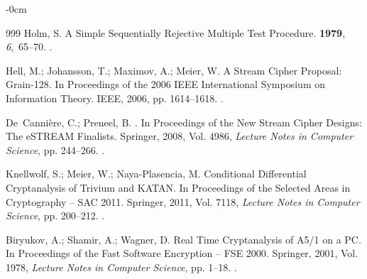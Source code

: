 \documentclass[electronics,article,submit,pdftex,oneauthor]{Definitions/mdpi}
\begin{document}
\begin{adjustwidth}{-\extralength}{0cm}
\begin{thebibliography}{999}
Holm, S.
\newblock A Simple Sequentially Rejective Multiple Test Procedure.
 {\bf 1979}, {\em 6},~65--70.
.

Hell, M.; Johansson, T.; Maximov, A.; Meier, W.
\newblock A Stream Cipher Proposal: {Grain}-128.
\newblock In Proceedings of the 2006 {IEEE} International Symposium on
  Information Theory. IEEE,  2006, pp. 1614--1618.
.

De~Canni{\`e}re, C.; Preneel, B.
.
\newblock In Proceedings of the New Stream Cipher Designs: The {eSTREAM}
  Finalists. Springer,  2008, Vol. 4986, {\em Lecture Notes in Computer
  Science}, pp. 244--266.
.

Knellwolf, S.; Meier, W.; Naya-Plasencia, M.
\newblock Conditional Differential Cryptanalysis of {Trivium} and {KATAN}.
\newblock In Proceedings of the Selected Areas in Cryptography -- {SAC} 2011.
  Springer,  2011, Vol. 7118, {\em Lecture Notes in Computer Science}, pp.
  200--212.
.

Biryukov, A.; Shamir, A.; Wagner, D.
\newblock Real Time Cryptanalysis of {A5/1} on a {PC}.
\newblock In Proceedings of the Fast Software Encryption -- {FSE} 2000.
  Springer,  2001, Vol. 1978, {\em Lecture Notes in Computer Science}, pp.
  1--18.
.

\end{thebibliography}

\end{adjustwidth}
\end{document}
